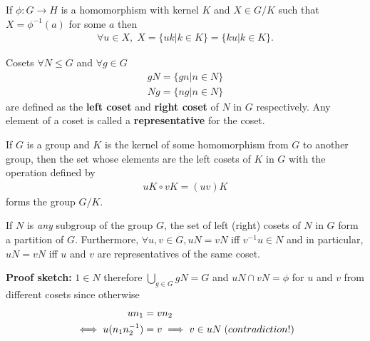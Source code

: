 \documentclass[titlepage, 12pt]{book}
\begin{document}
\begin{proposition}{}{}
    If $\phi:G\rightarrow H$ is a homomorphism with kernel $K$ and $X\in G/K$
    such that $X = \phi^{-1}(a)$ for some $a$ then \begin{gather*} \forall u\in X,\;X = \{uk | k\in K\} = \{ku | k\in K\}.
    \end{gather*}
\end{proposition}
\begin{definition}{Cosets}{}
    $\forall N\le G$ and $\forall g\in G$
    \begin{gather*}
       gN = \{gn | n\in N\}\\
       Ng = \{ng | n\in N\}
    \end{gather*}
    are defined as the \textbf{left coset} and \textbf{right coset} of $N$ in
    $G$ respectively. Any element of a coset is called a \textbf{representative}
    for the coset.
\end{definition}
\begin{theorem}{}{}
    If $G$ is a group and $K$ is the kernel of some homomorphism from $G$ to
    another group, then the set whose elements are the left cosets of $K$ in $G$
    with the operation defined by
    \begin{gather*}
        uK\circ vK = (uv)K
    \end{gather*}
    forms the group $G/K$.
\end{theorem}
\begin{proposition}{}{}
    If $N$ is \textit{any} subgroup of the group $G$, the set of left (right) cosets of $N$ in
    $G$ form a partition of $G$. Furthermore, $\forall u, v\in G, uN = vN$ iff
    $v^{-1}u\in N$ and in particular, $uN = vN$ iff $u$ and $v$ are
    representatives of the same coset.
\end{proposition}
\textbf{Proof sketch:} $1\in N$ therefore $\bigcup\limits_{g\in G} gN = G$ and
$uN\cap vN = \phi$ for $u$ and $v$ from different cosets since otherwise
\begin{align*}
    un_1 &= vn_2\\
    \iff u(n_1n_2^{-1}) &= v\implies v\in uN\;\textrm(contradiction!)
\end{align*}
\end{document}
